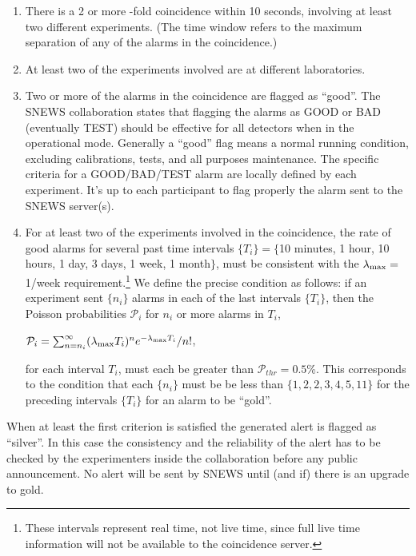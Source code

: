 \documentclass{article}
\begin{document}
\begin{enumerate}

\item There is a 2 or more -fold coincidence within 10 seconds,
involving at least two different experiments. 
(The time window refers to the maximum
separation of any of the alarms in the coincidence.)

\item At least two of the experiments involved
are at different laboratories.

\item Two or more of the alarms in the coincidence
are flagged as ``good''.  The SNEWS collaboration states
that flagging the alarms as GOOD or BAD (eventually TEST) should be effective 
for all detectors when in the operational  mode. 
Generally a ``good'' flag means a normal running condition, excluding 
calibrations, tests, and all purposes maintenance.  
The specific criteria for a GOOD/BAD/TEST alarm are locally defined by
each experiment. 
It's up to each participant to flag properly the alarm sent to the SNEWS 
server(s).  
 
\item For at least two of the experiments involved in the coincidence,
the rate of good alarms for several past time intervals $\{T_i\}=\{$10 minutes, 1
hour, 10 hours, 1 day, 3 days, 1 week, 1 month$\}$, must be consistent with
the $\lambda_{\rm{max}}=$1/week requirement.\footnote{These intervals
represent real time, not live time, since full live time information
will not be available to the coincidence server.}
We define the precise condition 
as follows:  
if an experiment sent $\{n_i\}$ alarms in 
each of the last intervals $\{T_i\}$,
then the Poisson probabilities $\mathcal{P}_i$ for $n_i$ or more
alarms in $T_i$,

$\mathcal{P}_i=\sum_{n=n_i}^{\infty}(\lambda_{\rm{max}} T_i)^{n}e^{-\lambda_{\rm{max}} T_i}/n!$,

for each interval $T_i$, must each be greater than $\mathcal{P}_{thr}=0.5$\%.
This corresponds to the condition that each $\{n_i\}$ must be be less
than $\{1,2,2,3,4,5,11\}$ for the preceding intervals $\{T_i\}$ for an
alarm to be ``gold''.

\end{enumerate}

When at least the first criterion is satisfied the generated alert is
flagged as ``silver''. In this case the consistency and the reliability 
of the alert has to be checked by the experimenters inside the collaboration before any public announcement. No alert will be sent by SNEWS until (and if)
there is an upgrade to gold.
\end{document}
